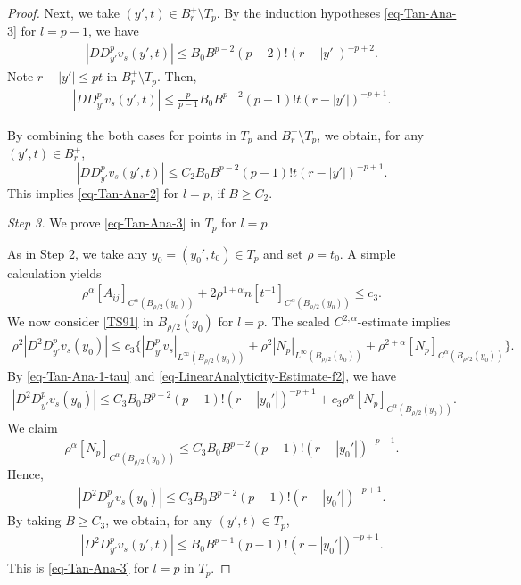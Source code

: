 \documentclass[11pt,reqno]{amsart}
\renewcommand{\leq}{\leqslant}
\renewcommand{\geq}{\geqslant}
\theoremstyle{definition}
\numberwithin{equation}{section}
\begin{document}
\begin{proof}
Next, we take $(y',t)\in B^+_r\setminus T_p$. By the induction hypotheses 
\eqref{eq-Tan-Ana-3} for $l=p-1$, we have 
\begin{align}|DD^p_{y'} v_s(y',t)|\leq B_0B^{p-2}(p-2)! (r-|y'|)^{-p+2}.\end{align}
Note $r-|y'|\leq pt$ in $B^+_r\setminus T_p$. Then, 
\begin{align}|DD^p_{y'} v_s(y',t)|\leq \frac{p}{p-1}B_0B^{p-2}(p-1)!t (r-|y'|)^{-p+1}.\end{align}

By combining the both cases for points in $T_p$ and $B^+_r\setminus T_p$, 
we obtain, for any $(y', t)\in B^+_r$, 
\begin{equation}\label{eq-Tan-Ana-2-tau}
|DD^p_{y'} v_s(y',t)|\leq C_2 B_0B^{p-2}(p-1)! t(r-|y'|)^{-p+1}.\end{equation}
This implies \eqref{eq-Tan-Ana-2} for $l=p$, if $B\geq  C_2$. 

{\it Step 3.} We prove \eqref{eq-Tan-Ana-3} in $T_p$ for $l=p$. 

As in Step 2, we take any $y_0=(y_0',t_0)\in T_p$ and set $\rho=t_0$. 
A simple calculation yields
\begin{align}\rho^\alpha[A_{ij}]_{C^\alpha(B_{\rho/2}(y_0))}
+2\rho^{1+\alpha}n[t^{-1}]_{C^\alpha(B_{\rho/2}(y_0))}
\leq c_3.\end{align}
We now consider \eqref{TS91} in $B_{\rho/2}(y_0)$ for $l=p$. 
The scaled $C^{2,\alpha}$-estimate implies 
\begin{align}\rho^2|D^2D_{y'}^p v_s(y_0)|\leq 
c_3\big\{|D_{y'}^pv_s|_{L^\infty(B_{\rho/2}(y_0))}+\rho^2|N_p|_{L^\infty(B_{\rho/2}(y_0))}
+\rho^{2+\alpha}[N_p]_{C^\alpha(B_{\rho/2}(y_0))}\big\}.\end{align}
By \eqref{eq-Tan-Ana-1-tau} and 
\eqref{eq-LinearAnalyticity-Estimate-f2}, we have 
\begin{align}|D^2D_{y'}^pv_s(y_0)|\leq 
C_3 B_0B^{p-2}(p-1)!(r-|y_0'|)^{-p+1}
+c_3\rho^{\alpha}[N_p]_{C^\alpha(B_{\rho/2}(y_0))}.\end{align}
We claim 
\begin{equation}\label{eq-LinearAnalyticity-Estimate-f3}
\rho^{\alpha}[N_p]_{C^\alpha(B_{\rho/2}(y_0))}\leq C_3 B_0B^{p-2}(p-1)!(r-|y_0'|)^{-p+1}.\end{equation}
Hence, 
\begin{align}|D^2D_{y'}^pv_s(y_0)|\leq 
C_3 B_0B^{p-2}(p-1)!(r-|y_0'|)^{-p+1}.\end{align}
By taking $B\geq  C_3$, we obtain, for any $(y',t)\in T_p$, 
\begin{align}|D^2D_{y'}^pv_s(y',t)|\leq B_0B^{p-1}(p-1)!(r-|y_0'|)^{-p+1}.\end{align} 
This is \eqref{eq-Tan-Ana-3} for $l=p$ in $T_p$. 


\end{proof}
\end{document}
